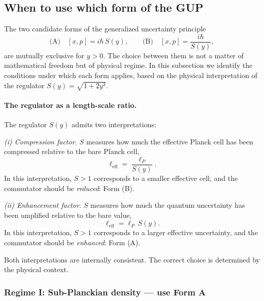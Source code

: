 \documentclass[a4paper,1pt,oneside,openany]{book}
\begin{document}
\subsection{When to use which form of the GUP}
\label{sec:when-GUP}

The two candidate forms of the generalized uncertainty principle
\begin{equation}
\text{(A)}\quad [x,p]=i\hbar\,S(y),
\qquad
\text{(B)}\quad [x,p]=\frac{i\hbar}{S(y)},
\label{eq:AB}
\end{equation}
are mutually exclusive for $y>0$. The choice between them is not 
a matter of mathematical freedom but of physical regime. In this 
subsection we identify the conditions under which each form 
applies, based on the physical interpretation of the regulator 
$S(y)=\sqrt{1+2y^{3}}$.

\paragraph{The regulator as a length-scale ratio.}
The regulator $S(y)$ admits two interpretations:

\emph{(i) Compression factor.} $S$ measures how much the 
effective Planck cell has been compressed relative to the bare 
Planck cell,
\begin{equation}
\ell_{\text{eff}}=\frac{\ell_{P}}{S(y)}.
\label{eq:l-eff-compression}
\end{equation}
In this interpretation, $S>1$ corresponds to a smaller effective 
cell, and the commutator should be \emph{reduced}: Form (B).

\emph{(ii) Enhancement factor.} $S$ measures how much the 
quantum uncertainty has been amplified relative to the bare 
value,
\begin{equation}
\ell_{\text{eff}}=\ell_{P}\,S(y).
\label{eq:l-eff-enhancement}
\end{equation}
In this interpretation, $S>1$ corresponds to a larger effective 
uncertainty, and the commutator should be \emph{enhanced}: Form 
(A).

Both interpretations are internally consistent. The correct 
choice is determined by the physical context.

\subsubsection{Regime I: Sub-Planckian density --- use Form A}
\end{document}
